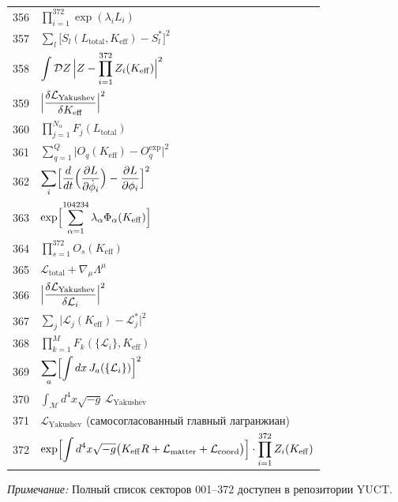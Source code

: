 \documentclass[12pt,a4paper]{article}
\begin{document}
\begin{longtable}{r p{}}
		356 & \(\displaystyle \prod_{i=1}^{372}\exp(\lambda_i L_i)\) \\
		357 & \(\displaystyle \sum_l\bigl[S_l(L_{\text{total}},K_{\mathrm{eff}}) - S_l^*\bigr]^2\) \\
		358 & \(\displaystyle \int\mathcal{D}Z\,\Bigl|Z - \prod_{i=1}^{372}Z_i(K_{\mathrm{eff}})\Bigr|^2\) \\
		359 & \(\displaystyle \Bigl|\frac{\delta\mathcal{L}_{\text{Yakushev}}}{\delta K_{\mathrm{eff}}}\Bigr|^2\) \\
		360 & \(\displaystyle \prod_{j=1}^{N_\alpha}F_j(L_{\text{total}})\) \\
		361 & \(\displaystyle \sum_{q=1}^Q\bigl|O_q(K_{\mathrm{eff}}) - O_q^{\text{exp}}\bigr|^2\) \\
		362 & \(\displaystyle \sum_i\Bigl[\frac{d}{dt}\Bigl(\frac{\partial L}{\partial\dot\phi_i}\Bigr) - \frac{\partial L}{\partial\phi_i}\Bigr]^2\) \\
		363 & \(\displaystyle \exp\Bigl[\sum_{\alpha=1}^{104234}\lambda_\alpha\Phi_\alpha(K_{\mathrm{eff}})\Bigr]\) \\
		364 & \(\displaystyle \prod_{s=1}^{372}O_s(K_{\mathrm{eff}})\) \\
		365 & \(\displaystyle \mathcal{L}_{\text{total}} + \nabla_\mu\Lambda^\mu\) \\
		366 & \(\displaystyle \Bigl|\frac{\delta\mathcal{L}_{\text{Yakushev}}}{\delta\mathcal{L}_i}\Bigr|^2\) \\
		367 & \(\displaystyle \sum_j\bigl|\mathcal{L}_j(K_{\mathrm{eff}}) - \mathcal{L}_j^*\bigr|^2\) \\
		368 & \(\displaystyle \prod_{k=1}^M F_k(\{\mathcal{L}_i\},K_{\mathrm{eff}})\) \\
		369 & \(\displaystyle \sum_a\Bigl[\int dx\,J_a(\{\mathcal{L}_i\})\Bigr]^2\) \\
		370 & \(\displaystyle \int_{\mathcal{M}} d^4x\sqrt{-g}\,\mathcal{L}_{\text{Yakushev}}\) \\
		371 & \(\displaystyle \mathcal{L}_{\text{Yakushev}}\) (самосогласованный главный лагранжиан) \\
		372 & \(\displaystyle \exp\Bigl[\int d^4x\sqrt{-g}\bigl(K_{\mathrm{eff}}R + \mathcal{L}_{\text{matter}} + \mathcal{L}_{\text{coord}}\bigr)\Bigr]\cdot\prod_{i=1}^{372}Z_i(K_{\mathrm{eff}})\) \\
		
	\end{longtable}
	
	\textit{Примечание:} Полный список секторов 001–372 доступен в репозитории YUCT.
	
\end{document}

